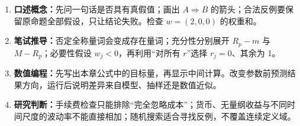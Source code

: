 \begingroup\small
\begin{enumerate}[nosep,leftmargin=*]
  \item \textbf{口述概念：}先问一句话是否具有真假值；画出 $A\Rightarrow B$ 的箭头；合法反例要保留原命题全部假设，只让结论失败。检查 $w=(2,0,0)$ 的权重和。
  \item \textbf{笔试推导：}否定全称量词会变成存在量词；充分性分别展开 $R_p-m$ 与 $M-R_p$；必要性假设 $w_j<0$，再利用“对所有 $r$”选择 $r_j=0$、其余为 1。
  \item \textbf{数值编程：}先写出本章公式中的目标量，再显示中间计算。改变参数前预测结果方向，运行后说明差异来自模型、抽样还是数值近似。
  \item \textbf{研究判断：}手续费检查只能排除“完全忽略成本”；货币、无量纲收益与不同时间尺度的波动率不能直接相加；随机搜索适合寻找反例，不覆盖连续定义域。
\end{enumerate}
\endgroup
